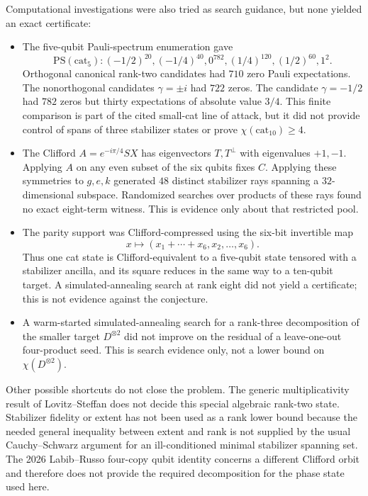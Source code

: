 \documentclass[11pt]{article}
\theoremstyle{definition}
\newcommand{\cat}{\mathrm{cat}}
\begin{document}
Computational investigations were also tried as search guidance, but none yielded an exact certificate:
\begin{itemize}
\item The five-qubit Pauli-spectrum enumeration gave
\[
\mathrm{PS}(\cat_5):
(-1/2)^{20},(-1/4)^{40},0^{782},
(1/4)^{120},(1/2)^{60},1^2.
\]
Orthogonal canonical rank-two candidates had $710$ zero Pauli expectations. The nonorthogonal candidates $\gamma=\pm i$ had $722$ zeros. The candidate $\gamma=-1/2$ had $782$ zeros but thirty expectations of absolute value $3/4$. This finite comparison is part of the cited small-cat line of attack, but it did not provide control of spans of three stabilizer states or prove $\chi(\cat_{10})\geq4$.

\item The Clifford $A=e^{-i\pi/4}SX$ has eigenvectors $T,T^\perp$ with eigenvalues $+1,-1$. Applying $A$ on any even subset of the six qubits fixes $C$. Applying these symmetries to $g,e,k$ generated $48$ distinct stabilizer rays spanning a $32$-dimensional subspace. Randomized searches over products of these rays found no exact eight-term witness. This is evidence only about that restricted pool.

\item The parity support was Clifford-compressed using the six-bit invertible map
\[
x\longmapsto(x_1+\cdots+x_6,x_2,\ldots,x_6).
\]
Thus one cat state is Clifford-equivalent to a five-qubit state tensored with a stabilizer ancilla, and its square reduces in the same way to a ten-qubit target. A simulated-annealing search at rank eight did not yield a certificate; this is not evidence against the conjecture.

\item A warm-started simulated-annealing search for a rank-three decomposition of the smaller target $D^{\otimes2}$ did not improve on the residual of a leave-one-out four-product seed. This is search evidence only, not a lower bound on $\chi(D^{\otimes2})$.
\end{itemize}

Other possible shortcuts do not close the problem. The generic multiplicativity result of Lovitz--Steffan does not decide this special algebraic rank-two state. Stabilizer fidelity or extent has not been used as a rank lower bound because the needed general inequality between extent and rank is not supplied by the usual Cauchy--Schwarz argument for an ill-conditioned minimal stabilizer spanning set. The 2026 Labib--Russo four-copy qubit identity concerns a different Clifford orbit and therefore does not provide the required decomposition for the phase state used here.
\end{document}
